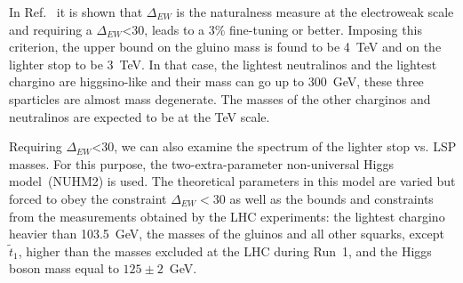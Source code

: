 

In Ref.~\cite{Baer:2016bwh} it is shown that $\Delta_{EW}$ is the naturalness measure at the electroweak scale and requiring a $\Delta_{EW}$<30, leads to a 3\% fine-tuning or better. Imposing this criterion, the upper bound on the  gluino mass is found to be 4~TeV and on the lighter stop to be 3~TeV. In that case, the lightest neutralinos and the lightest chargino are higgsino-like and their mass can go up to 300~GeV, these three sparticles are almost mass degenerate. The masses of the other charginos and neutralinos are expected to be at the TeV scale.

Requiring $\Delta_{EW}$<30, we can also examine the spectrum of the lighter stop vs. LSP masses. For this purpose, the two-extra-parameter non-universal Higgs model~(NUHM2) \cite{Matalliotakis:1994ft, Baer:2005bu} is used. The theoretical parameters in this model are varied but forced to obey the constraint $\Delta_{EW} <30$ as well as the bounds and constraints from the measurements obtained by the LHC experiments: the lightest chargino heavier than 103.5~GeV, the masses of the gluinos and all other squarks,  except $\tilde{t}_{1}$, higher than the masses excluded at the LHC during Run~1, and the Higgs boson mass equal to $125 \pm 2$~GeV. 

